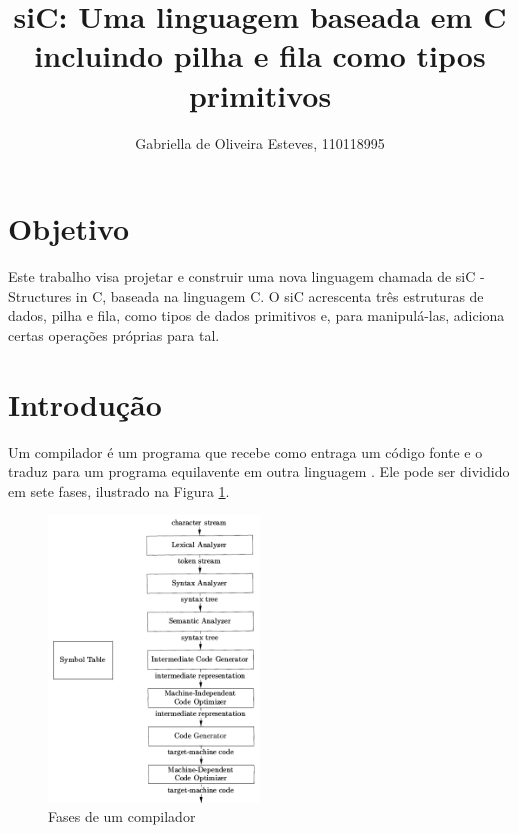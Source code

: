 \documentclass[12pt]{article}
\title{siC: Uma linguagem baseada em C incluindo pilha e fila como tipos primitivos}
\author{Gabriella de Oliveira Esteves, 110118995}
\begin{document}
 

\maketitle

\section{Objetivo}

Este trabalho visa projetar e construir uma nova linguagem chamada de siC - Structures in C, baseada na linguagem C. O siC acrescenta três estruturas de dados, pilha e fila, como tipos de dados primitivos e, para manipulá-las, adiciona certas operações próprias para tal.

\section{Introdução}

\indent Um compilador é um programa que recebe como entraga um código fonte e o traduz para um programa equilavente em outra linguagem \cite{book}. Ele pode ser dividido em sete fases, ilustrado na Figura \ref{fig:compilador}.

\begin{figure}[!ht]
  \centering
  \includegraphics[width=0.5\textwidth]{compilador.png}
  \caption{Fases de um compilador} \label{fig:compilador}
\end{figure}
\end{document}
